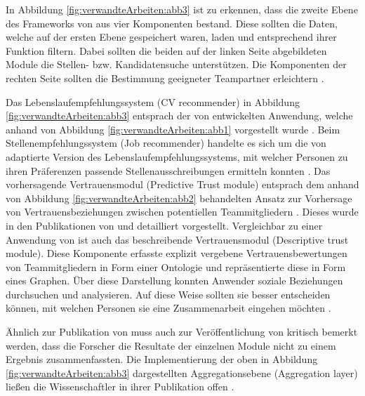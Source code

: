 In Abbildung \ref{fig:verwandteArbeiten:abb3} ist zu erkennen, dass die zweite Ebene des Frameworks von \textcite[S. 5ff.]{keim:2007} aus vier Komponenten bestand. Diese sollten die Daten, welche auf der ersten Ebene gespeichert waren, laden und entsprechend ihrer Funktion filtern. Dabei sollten die beiden auf der linken Seite abgebildeten Module die Stellen- bzw. Kandidatensuche unterstützen. Die Komponenten der rechten Seite sollten die Bestimmung geeigneter Teampartner erleichtern \cite[S. 5]{keim:2007}.

Das Lebenslaufempfehlungssystem (CV recommender) in Abbildung \ref{fig:verwandteArbeiten:abb3} entsprach der von \textcite[S. 8ff.]{faerber:2003} entwickelten Anwendung, welche anhand von Abbildung \ref{fig:verwandteArbeiten:abb1} vorgestellt wurde \cite[S. 6]{keim:2007}. Beim Stellenempfehlungssystem (Job recommender) handelte es sich um die von \textcite[S. 4ff.]{malinowski:2006} adaptierte Version des Lebenslaufempfehlungssystems, mit welcher Personen zu ihren Präferenzen passende Stellenausschreibungen ermitteln konnten \cite[S. 6]{keim:2007}. Das vorhersagende Vertrauensmodul (Predictive Trust module) entsprach dem anhand von Abbildung \ref{fig:verwandteArbeiten:abb2} behandelten Ansatz zur Vorhersage von Vertrauensbeziehungen zwischen potentiellen Teammitgliedern \cite[S. 8]{keim:2007}. Dieses wurde in den Publikationen von \textcite[S. 5ff.]{keim:2005} und \textcite[S. 4ff.]{malinowski:2005} detailliert vorgestellt. Vergleichbar zu einer Anwendung von \textcite[S. 4f.]{keim:2005} ist auch das beschreibende Vertrauensmodul (Descriptive trust module). Diese Komponente erfasste explizit vergebene Vertrauensbewertungen von Teammitgliedern in Form einer Ontologie und repräsentierte diese in Form eines Graphen. Über diese Darstellung konnten Anwender soziale Beziehungen durchsuchen und analysieren. Auf diese Weise sollten sie besser entscheiden können, mit welchen Personen sie eine Zusammenarbeit eingehen möchten \cite[S. 7]{keim:2007}.

Ähnlich zur Publikation von \textcite[S. 3ff.]{malinowski:2006} muss auch zur Veröffentlichung von \textcite[S. 5ff.]{keim:2007} kritisch bemerkt werden, dass die Forscher die Resultate der einzelnen Module nicht zu einem Ergebnis zusammenfassten. Die Implementierung der oben in Abbildung \ref{fig:verwandteArbeiten:abb3} dargestellten Aggregationsebene (Aggregation layer) ließen die Wissenschaftler in ihrer Publikation offen \cite[S. 8]{keim:2007}.

